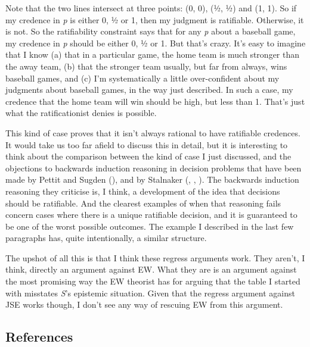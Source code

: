 \documentclass[
  11pt,
  letterpaper,
  DIV=11,
  numbers=noendperiod,
  twoside]{scrartcl}
\begin{document}
Note that the two lines intersect at three points: (0, 0), (½, ½) and
(1, 1). So if my credence in \emph{p} is either 0, ½ or 1, then my
judgment is ratifiable. Otherwise, it is not. So the ratifiability
constraint says that for any \emph{p} about a baseball game, my credence
in \emph{p} should be either 0, ½ or 1. But that's crazy. It's easy to
imagine that I know (a) that in a particular game, the home team is much
stronger than the away team, (b) that the stronger team usually, but far
from always, wins baseball games, and (c) I'm systematically a little
over-confident about my judgments about baseball games, in the way just
described. In such a case, my credence that the home team will win
should be high, but less than 1. That's just what the ratificationist
denies is possible.

This kind of case proves that it isn't always rational to have
ratifiable credences. It would take us too far afield to discuss this in
detail, but it is interesting to think about the comparison between the
kind of case I just discussed, and the objections to backwards induction
reasoning in decision problems that have been made by Pettit and Sugden
(), and by Stalnaker
(, ,
). The backwards induction reasoning
they criticise is, I think, a development of the idea that decisions
should be ratifiable. And the clearest examples of when that reasoning
fails concern cases where there is a unique ratifiable decision, and it
is guaranteed to be one of the worst possible outcomes. The example I
described in the last few paragraphs has, quite intentionally, a similar
structure.

The upshot of all this is that I think these regress arguments work.
They aren't, I think, directly an argument against EW. What they are is
an argument against the most promising way the EW theorist has for
arguing that the table I started with misstates \emph{S}'s epistemic
situation. Given that the regress argument against JSE works though, I
don't see any way of rescuing EW from this argument.

\subsection*{References}\label{references}
\end{document}
